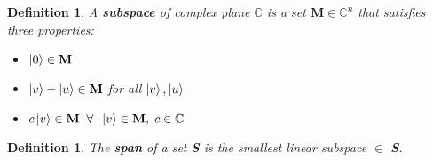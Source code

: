 \documentclass[12pt]{article}
\theoremstyle{plain}
\theoremstyle{nonumberplain}
\theoremstyle{plain}
\newtheorem{definition}[lemma]{Definition}
\theoremstyle{nonumberplain}
\newcommand\1{{\bf 1}}
\newcommand{\C}{\mathbb{C}} %
\newcommand{\<}{\left\langle}
\renewcommand{\>}{\right\rangle}
\begin{document}
\begin{definition}
A \textbf{subspace} of complex plane $\C$ is a set $\mathbf{M} \in \C^n$ that satisfies three properties:
\begin{itemize}
\item $\ket{0} \in \mathbf{M}$
\item $\ket{v} + \ket{u} \in  \mathbf{M}$ for all $\ket{v}, \ket{u}$
\item $c\ket{v} \in \mathbf{M}\;\; \forall\;\; \ket{v} \in \mathbf{M},\; c \in \C$
\end{itemize}   
\end{definition}

\begin{definition}
The \textbf{span} of a set \textbf{S} is the smallest linear subspace $\in$ \textbf{S}.  
\end{definition}
\end{document}
